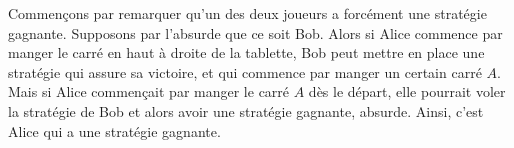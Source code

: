 \begin{sol}
Commençons par remarquer qu'un des deux joueurs a forcément une stratégie gagnante. Supposons par l'absurde que ce soit Bob. Alors si Alice commence par manger le carré en haut à droite de la tablette, Bob peut mettre en place une stratégie qui assure sa victoire, et qui commence par manger un certain carré $A$. Mais si Alice commençait par manger le carré $A$ dès le départ, elle pourrait voler la stratégie de Bob et alors avoir une stratégie gagnante, absurde. Ainsi, c'est Alice qui a une stratégie gagnante.
\end{sol}
